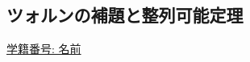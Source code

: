 \documentclass[dvipdfmx,a4paper,11pt]{article}
\theoremstyle{definition}
\begin{document}

 
 
 
 \newpage
 
 \begin{center}
\section{ツォルンの補題と整列可能定理}
\label{sec-9}
\end{center}


  \begin{flushleft}
{ \large \underline{学籍番号: \hspace{4cm} 名前  \hspace{8.5cm}}}
{\footnotesize }
\end{flushleft}
\end{document}

